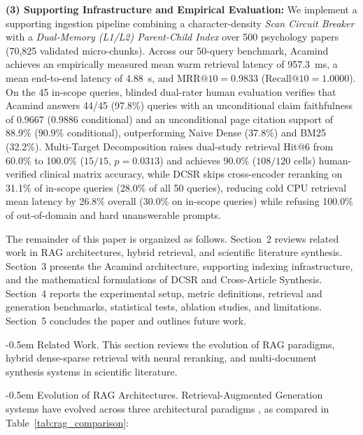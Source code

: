\documentclass[10pt]{SPIIRAS_Proceedings}
\makeatletter
\renewcommand\section{\@startsection{section}{1}{\parindent}%
  {\z@}%
  {-0.5em}%
  {\normalfont\normalsize\bfseries}}
\renewcommand\subsection{\@startsection{subsection}{2}{\parindent}%
  {\z@}%
  {-0.5em}%
  {\normalfont\normalsize\bfseries}}
\makeatother
\begin{document}
\textbf{(3) Supporting Infrastructure and Empirical Evaluation:} We implement a supporting ingestion pipeline combining a character-density \textit{Scan Circuit Breaker} with a \textit{Dual-Memory (L1/L2) Parent-Child Index} over 500 psychology papers (70,825 validated micro-chunks). Across our 50-query benchmark, Acamind achieves an empirically measured mean warm retrieval latency of 957.3~ms, a mean end-to-end latency of 4.88~s, and $\mathrm{MRR@10} = 0.9833$ ($\mathrm{Recall@10} = 1.0000$). On the 45 in-scope queries, blinded dual-rater human evaluation verifies that Acamind answers 44/45 (97.8\%) queries with an unconditional claim faithfulness of $0.9667$ ($0.9886$ conditional) and an unconditional page citation support of 88.9\% ($90.9\%$ conditional), outperforming Naive Dense (37.8\%) and BM25 (32.2\%). Multi-Target Decomposition raises dual-study retrieval Hit@6 from 60.0\% to 100.0\% ($15/15$, $p = 0.0313$) and achieves 90.0\% ($108/120$ cells) human-verified clinical matrix accuracy, while DCSR skips cross-encoder reranking on 31.1\% of in-scope queries (28.0\% of all 50 queries), reducing cold CPU retrieval mean latency by 26.8\% overall (30.0\% on in-scope queries) while refusing 100.0\% of out-of-domain and hard unanswerable prompts.

The remainder of this paper is organized as follows. Section~2 reviews related work in RAG architectures, hybrid retrieval, and scientific literature synthesis. Section~3 presents the Acamind architecture, supporting indexing infrastructure, and the mathematical formulations of DCSR and Cross-Article Synthesis. Section~4 reports the experimental setup, metric definitions, retrieval and generation benchmarks, statistical tests, ablation studies, and limitations. Section~5 concludes the paper and outlines future work.

\section{Related Work.} This section reviews the evolution of RAG paradigms, hybrid dense-sparse retrieval with neural reranking, and multi-document synthesis systems in scientific literature.

\subsection{Evolution of RAG Architectures.} Retrieval-Augmented Generation systems have evolved across three architectural paradigms \cite{gao2023retrieval}, as compared in Table~\ref{tab:rag_comparison}:
\end{document}
